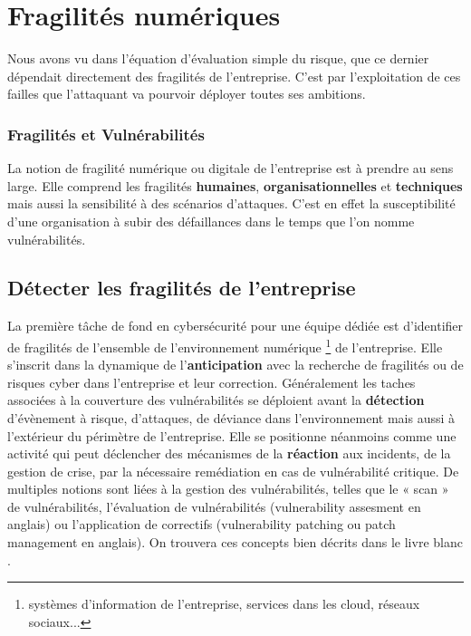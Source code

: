 \uchap{\jobname}

\section{Fragilités numériques}

Nous avons vu dans l'équation d'évaluation simple du risque, que ce dernier dépendait directement des fragilités de l'entreprise. C'est par l'exploitation de ces failles que l'attaquant va pourvoir déployer toutes ses ambitions.

\begin{frame}
\frametitle<presentation>{Fragilités et Vulnérabilités}
La notion de fragilité numérique ou digitale de l'entreprise est à prendre au sens large. Elle comprend les fragilités \textbf{humaines}, \textbf{organisationnelles} et \textbf{techniques} mais aussi la sensibilité à des scénarios d'attaques. C'est en effet la susceptibilité d’une organisation à subir des défaillances dans le temps que l'on nomme vulnérabilités.
\end{frame}

\subsection{Détecter les fragilités de l’entreprise}

La première tâche de fond en cybersécurité pour une équipe dédiée est d'identifier de fragilités de l'ensemble de l'environnement numérique \footnote{systèmes d'information de l'entreprise, services dans les cloud, réseaux sociaux...} de l'entreprise. Elle s'inscrit dans la dynamique de l'\textbf{anticipation} avec la recherche de fragilités ou de risques cyber dans l'entreprise et leur correction. Généralement les taches associées à la couverture des vulnérabilités se déploient avant la \textbf{détection} d'évènement à risque, d'attaques, de déviance dans l'environnement mais aussi à l'extérieur du périmètre de l'entreprise.
Elle se positionne néanmoins comme une activité qui peut déclencher des mécanismes de la \textbf{réaction} aux incidents, de la gestion de crise, par la nécessaire remédiation en cas de vulnérabilité critique.
De multiples notions sont liées à la gestion des vulnérabilités, telles que le « scan » de vulnérabilités, l’évaluation de vulnérabilités (vulnerability assesment en anglais) ou l’application de correctifs (vulnerability patching ou patch management en anglais). On trouvera ces concepts bien décrits dans le livre blanc .



